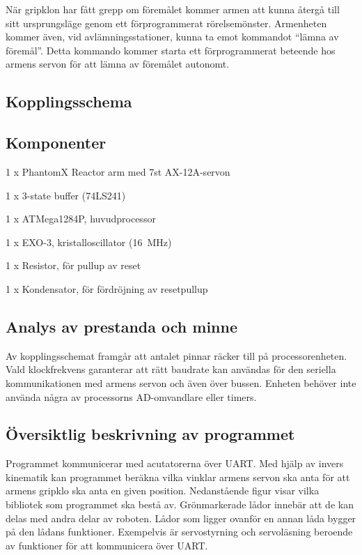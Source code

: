 När gripklon har fått grepp om föremålet kommer armen att kunna återgå till sitt ursprungsläge genom ett förprogrammerat rörelsemönster. Armenheten kommer även, vid avlämningsstationer, kunna ta emot kommandot “lämna av föremål”. Detta kommando kommer starta ett förprogrammerat beteende hos armens servon för att lämna av föremålet autonomt. 


\subsection{Kopplingsschema}


\subsection{Komponenter}

\begin{packed_itemize}
\item 1 x PhantomX Reactor arm med 7st AX-12A-servon
\item 1 x 3-state buffer (74LS241)
\item 1 x ATMega1284P, huvudprocessor
\item 1 x EXO-3, kristalloscillator (16~MHz)
\item 1 x Resistor, för pullup av reset
\item 1 x Kondensator, för fördröjning av resetpullup
\end{packed_itemize}



\subsection{Analys av prestanda och minne}

Av kopplingsschemat framgår att antalet pinnar räcker till på processorenheten. Vald klockfrekvens garanterar att rätt baudrate kan användas för den seriella kommunikationen med armens servon och även över bussen.
Enheten behöver inte använda några av processorns AD-omvandlare eller timers.


\subsection{Översiktlig beskrivning av programmet}

Programmet kommunicerar med acutatorerna över UART. Med hjälp av invers kinematik kan programmet beräkna vilka vinklar armens servon ska anta för att armens gripklo ska anta en given position. Nedanstående figur visar vilka bibliotek som programmet ska bestå av. Grönmarkerade lådor innebär att de kan delas med andra delar av roboten. Lådor som ligger ovanför en annan låda bygger på den lådans funktioner. Exempelvis är servostyrning och servoläsning beroende av funktioner för att kommunicera över UART.


